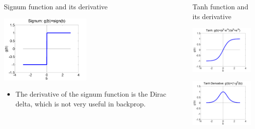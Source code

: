 \documentclass{beamer}
\begin{document}
\begin{frame}
  \begin{columns}[t]
    \column{2.25in}
    \begin{block}{Signum function and its derivative}
      \centerline{\includegraphics[width=1.75in]{figs/nn_signum.png}}
      \begin{itemize}
      \item The derivative of the signum function is the Dirac
        delta, which is not very useful in backprop.
      \end{itemize}
    \end{block}
    \column{2.25in}
    \begin{block}{Tanh function and its derivative}
      \centerline{\includegraphics[width=1.75in]{figs/nn_tanh.png}}
      \centerline{\includegraphics[width=1.75in]{figs/nn_tanhprime.png}}
    \end{block}
  \end{columns}
\end{frame}
\end{document}
